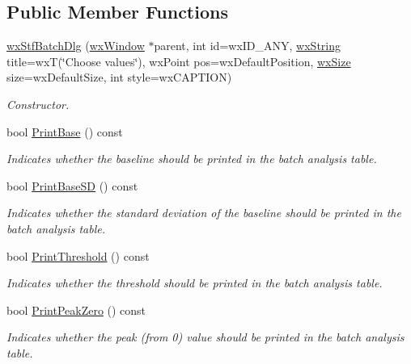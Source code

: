 \subsection*{Public Member Functions}
\begin{DoxyCompactItemize}
\item 
\hyperlink{classwxStfBatchDlg_a675ec9b423de62fdf8b6338ac105ed5a}{wxStfBatchDlg} (\hyperlink{classwxWindow}{wxWindow} $\ast$parent, int id=wxID\_\-ANY, \hyperlink{classwxString}{wxString} title=wxT(\char`\"{}Choose values\char`\"{}), wxPoint pos=wxDefaultPosition, \hyperlink{classwxSize}{wxSize} size=wxDefaultSize, int style=wxCAPTION)
\begin{DoxyCompactList}\small\item\em Constructor. \item\end{DoxyCompactList}\item 
bool \hyperlink{classwxStfBatchDlg_a4cf3b7330fba6d6a39aff6894d534ddc}{PrintBase} () const 
\begin{DoxyCompactList}\small\item\em Indicates whether the baseline should be printed in the batch analysis table. \item\end{DoxyCompactList}\item 
bool \hyperlink{classwxStfBatchDlg_a9f6762e76bbe7657ee3acbf305f81bfc}{PrintBaseSD} () const 
\begin{DoxyCompactList}\small\item\em Indicates whether the standard deviation of the baseline should be printed in the batch analysis table. \item\end{DoxyCompactList}\item 
bool \hyperlink{classwxStfBatchDlg_a79d3b5f5870dafc7a410611cef0605e7}{PrintThreshold} () const 
\begin{DoxyCompactList}\small\item\em Indicates whether the threshold should be printed in the batch analysis table. \item\end{DoxyCompactList}\item 
bool \hyperlink{classwxStfBatchDlg_afa1c7b24cef42c6a97eb4b949282a633}{PrintPeakZero} () const 
\begin{DoxyCompactList}\small\item\em Indicates whether the peak (from 0) value should be printed in the batch analysis table. \item\end{DoxyCompactList}\item 

\end{DoxyCompactItemize}

